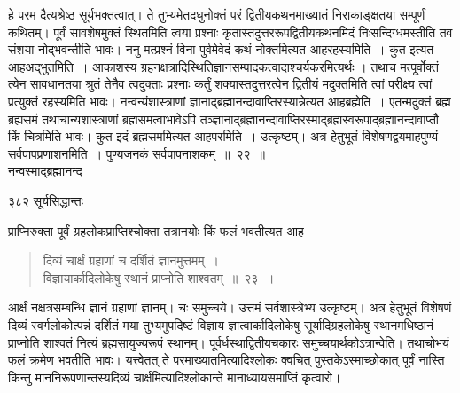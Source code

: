 \documentclass[11pt, openany]{book}
\begin{document}
 हे परम दैत्यश्रेष्ठ सूर्यभक्तत्वात्। ते तुभ्यमेतदधुनोक्तं परं द्वितीयकथनमाख्यातं निराकाङ्क्षतया सम्पूर्णं कथितम्। पूर्वं सावशेषमुक्तं स्थितमिति त्वया प्रश्नाः कृतास्तदुत्तररूपद्वितीयकथनमिदं निःसन्दिग्धमस्तीति तव संशया नोद्भवन्तीति भावः। ननु मत्प्रश्नं विना पुर्वमेवेदं कथं नोक्तमित्यत आह\textendash रहस्यमिति~। कुत इत्यत आह\textendash अद्भुतमिति~। आकाशस्य ग्रहनक्षत्रादिस्थितिज्ञानसम्पादकत्वादाश्चर्यकरमित्यर्थः । तथाच मत्पूर्वोक्तं त्येन सावधानतया श्रुतं तेनैव त्वदुक्ताः प्रश्नाः कर्तुं शक्यास्तदुत्तरत्वेन द्वितीयं मदुक्तमिति त्वां परीक्ष्य त्वां प्रत्युक्तं रहस्यमिति भावः। नन्वन्यंशास्त्राणां ज्ञानाद्ब्रह्मानन्दावाप्तिरस्यान्नेत्यत आह\textendash ब्रह्मेति~। एतन्मदुक्तं ब्रह्म ब्रह्यसमं तथाचान्यशास्त्राणां ब्रह्मसमत्वाभावेऽपि तञ्ज्ञानाद्ब्रह्मानन्दावाप्तिरस्माद्ब्रह्मस्वरूपाद्ब्रह्मानन्दावाप्तौ किं चित्रमिति भावः। कुत इदं ब्रह्मसममित्यत आह\textendash परमिति~। उत्कृष्टम्। अत्र हेतुभूतं विशेषणद्वयमाह\textendash पुण्यं सर्वपापप्रणाशनमिति~। पुण्यजनकं सर्वपापनाशकम्~॥~२२~॥\\
 \noindent नन्वस्माद्ब्रह्मानन्द\textendash



\newpage


\noindent ३८२ \hspace{4cm} सूर्यसिद्धान्तः
\vspace{1cm}


प्राप्निरुक्ता पूर्वं ग्रहलोकप्राप्तिश्चोक्ता तत्रानयोः किं फलं भवतीत्यत आह\textendash 


\begin{quote}
 {\ssi दिव्यं चार्क्षं ग्रहाणां च दर्शितं ज्ञानमुत्तमम्~।\\
विज्ञायार्कादिलोकेषु स्थानं प्राप्नोति शाश्वतम्~॥~२३~॥ }
\end{quote}

 आर्क्षं नक्षत्रसम्बन्धि ज्ञानं ग्रहाणां ज्ञानम्। चः समुच्चये। उत्तमं सर्वशास्त्रेभ्य उत्कृष्टम्। अत्र हेतुभूतं विशेषणं दिव्यं स्वर्गलोकोत्पन्नं दर्शितं मया तुभ्यमुपदिष्टं विज्ञाय ज्ञात्वार्कादिलोकेषु सूर्यादिग्रहलोकेषु स्थानमधिष्ठानं प्राप्नोति शाश्वतं नित्यं ब्रह्मसायुज्यरूपं स्थानम्। पूर्वर्धस्थाद्वितीयचकारः समुच्चयार्थकोऽत्रान्वेति। तथाचोभयं फलं क्रमेण भवतीति भावः। यत्त्वेतत् ते परमाख्यातमित्यादिश्लोकः क्वचित् पुस्तकेऽस्माच्छोकात् पूर्वं नास्ति किन्तु माननिरूपणान्तस्यदिव्यं चार्क्षमित्यादिश्लोकान्ते मानाध्यायसमाप्तिं कृत्वारो। 

\end{document}
